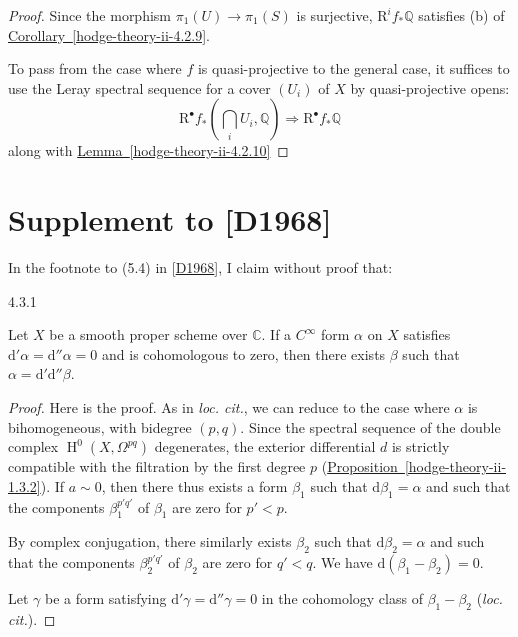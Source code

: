\begin{proof}
    Since the morphism \(\pi _1(U)\to \pi _1(S)\) is surjective, \(\mathrm {R}^if_*\mathbb {Q}\) satisfies (b) of \hyperref[hodge-theory-ii-4.2.9]{Corollary~\ref*{hodge-theory-ii-4.2.9}}.\par{}To pass from the case where \(f\) is quasi-projective to the general case, it suffices to use the Leray spectral sequence for a cover \((U_i)\) of \(X\) by quasi-projective opens:
    \[       \mathrm {R}^\bullet  f_*\left (\bigcap _i U_i,\mathbb {Q}\right )       \Rightarrow  \mathrm {R}^\bullet  f_*\mathbb {Q}     \]
    along with \hyperref[hodge-theory-ii-4.2.10]{Lemma~\ref*{hodge-theory-ii-4.2.10}}\end{proof}\section{Supplement to [D1968]}\label{hodge-theory-ii-4.3}\par{}In the footnote to (5.4) in [\hyperref[D1968]{D1968}], I claim without proof that:\begin{proposition}{4.3.1}\label{hodge-theory-ii-4.3.1}\skipsinglepar\par{}Let \(X\) be a smooth proper scheme over \(\mathbb {C}\).
    If a \(C^\infty \) form \(\alpha \) on \(X\) satisfies \(\mathrm {d}'\alpha =\mathrm {d}''\alpha =0\) and is cohomologous to zero, then there exists \(\beta \) such that \(\alpha =\mathrm {d}'\mathrm {d}''\beta \).\begin{proof}\par{}Here is the proof.
      As in \emph{loc. cit.}, we can reduce to the case where \(\alpha \) is bihomogeneous, with bidegree \((p,q)\).
      Since the spectral sequence of the double complex \(\operatorname {H}^0(X,\Omega ^{pq})\) degenerates, the exterior differential \(d\) is strictly compatible with the filtration by the first degree \(p\) (\hyperref[hodge-theory-ii-1.3.2]{Proposition~\ref*{hodge-theory-ii-1.3.2}}).
      If \(a\sim 0\), then there thus exists a form \(\beta _1\) such that \(\mathrm {d}\beta _1=\alpha \) and such that the components \(\beta _1^{p'q'}\) of \(\beta _1\) are zero for \(p'<p\).\par{}By complex conjugation, there similarly exists \(\beta _2\) such that \(\mathrm {d}\beta _2=\alpha \) and such that the components \(\beta _2^{p'q'}\) of \(\beta _2\) are zero for \(q'<q\).
      We have \(\mathrm {d}(\beta _1-\beta _2)=0\).\par{}Let \(\gamma \) be a form satisfying \(\mathrm {d}'\gamma =\mathrm {d}''\gamma =0\) in the cohomology class of \(\beta _1-\beta _2\) (\emph{loc. cit.}).

\end{proof}
\end{proposition}
